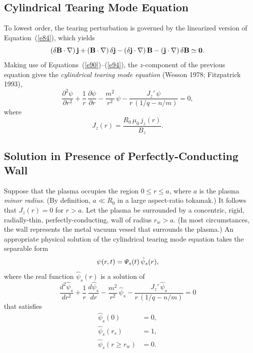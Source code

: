 \documentclass[notitlepage,12pt]{article}
\begin{document}
\subsection{Cylindrical Tearing Mode Equation}
To lowest order, the tearing perturbation is governed by the linearized version of Equation~(\ref{e84}), which yields
\begin{equation}\label{e96}
(\delta{\bf B}\cdot \nabla)\,{\bf j} + ({\bf B}\cdot\nabla)\,\delta{\bf j} - (\delta{\bf j}\cdot\nabla)\,{\bf B} - 
({\bf j}\cdot\nabla)\,\delta {\bf B}\simeq {\bf 0}.
\end{equation}
Making use of Equations~(\ref{e90})--(\ref{e94}), the $z$-component of the previous equation gives
the {\em cylindrical tearing mode equation}\/ (Wesson 1978; Fitzpatrick 1993),
\begin{equation}\label{e97}
\frac{\partial^2\psi}{\partial r^2} + \frac{1}{r}\,\frac{\partial\psi}{\partial r}-\frac{m^2}{r^2}\,\psi - \frac{J_z'\,\psi}{r\,(1/q-n/m)}=  0,
\end{equation}
where 
\begin{equation}
J_z(r)= \frac{R_0\,\mu_0\,j_z(r)}{B_z}.
\end{equation}

\subsection{Solution in Presence of Perfectly-Conducting Wall}\label{perfect}
Suppose that the plasma occupies the region $0\leq r\leq a$, where $a$ is the plasma {\em minor radius}. (By definition, $a\ll R_0$ in a large aspect-ratio tokamak.) It follows that
$J_z(r)=0$ for $r>a$. Let the plasma be surrounded by a concentric, rigid, radially-thin, perfectly-conducting, wall of radius $r_w>a$. 
(In most circumstances, the wall represents the metal vacuum vessel that surrounds  the plasma.) An appropriate
physical solution of the cylindrical tearing mode equation takes the separable form
\begin{equation}\label{e99}
\psi(r,t)= {\mit\Psi}_s(t)\,\hat{\psi}_s(r),
\end{equation}
where the real function $\hat{\psi}_s(r)$ is a solution of 
\begin{equation}\label{e100}
\frac{d^2\hat{\psi}_s}{dr^2} + \frac{1}{r}\,\frac{d\hat{\psi}_s}{dr}-\frac{m^2}{r^2}\,\hat{\psi}_s - \frac{J_z'\,\hat{\psi}_s}{r\,(1/q-n/m)}= 0
\end{equation}
that satisfies
\begin{align}\label{e101}
\hat{\psi}_s(0) &= 0,\\[0.5ex]
\hat{\psi}_s(r_s) &= 1,\label{e102}\\[0.5ex]
\hat{\psi}_s(r\geq r_w) &= 0.\label{e103}
\end{align}
\end{document}
